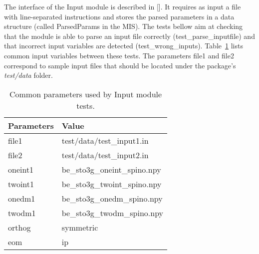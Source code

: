 \documentclass[12pt, titlepage]{article}
\begin{document}
The interface of the Input  module is described in [\cite{MIS2020}]. It 
requires as input a file with line-separated instructions and stores the parsed 
parameters in a data structure (called ParsedParams in the MIS). The tests 
bellow aim at checking that the module is able to parse an input file correctly 
(test\_parse\_inputfile) and that incorrect input variables are detected 
(test\_wrong\_inputs). Table~\ref{table:loaddata} lists common input variables 
between these tests. The parameters file1 and file2 correspond to sample input 
files that should be located under the package's \textit{test/data} folder.
\begin{table}[h!]
	\centering
	\begin{tabular}{ll}
		Parameters& Value\\
		\midrule
		file1& test/data/test\_input1.in\\
		file2 & test/data/test\_input2.in\\ 
		oneint1 & be\_sto3g\_oneint\_spino.npy\\
		twoint1 & be\_sto3g\_twoint\_spino.npy\\
		onedm1 & be\_sto3g\_onedm\_spino.npy\\
		twodm1 & be\_sto3g\_twodm\_spino.npy\\
		orthog& symmetric\\
		eom& ip\\
		\bottomrule
	\end{tabular}
	\caption{Common parameters used by Input module tests.}
	\label{table:loaddata}
\end{table}
\end{document}
